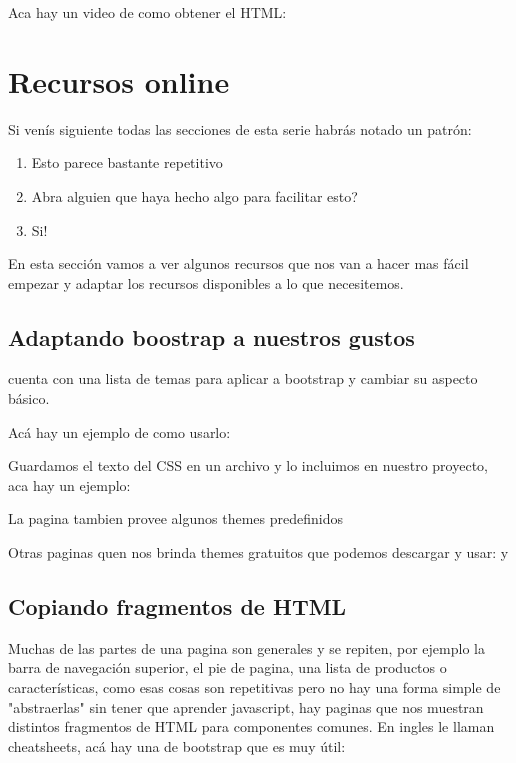 \documentclass[letterpaper,10pt,spanish]{sphinxmanual}
\begin{document}
Aca hay un video de como obtener el HTML:




\chapter{Recursos online}
\label{\detokenize{recursos-online::doc}}\label{\detokenize{recursos-online:recursos-online}}
Si venís siguiente todas las secciones de esta serie habrás notado un patrón:
\begin{enumerate}
\item {} 
Esto parece bastante repetitivo

\item {} 
Abra alguien que haya hecho algo para facilitar esto?

\item {} 
Si!

\end{enumerate}

En esta sección vamos a ver algunos recursos que nos van a hacer mas
fácil empezar y adaptar los recursos disponibles a lo que necesitemos.


\section{Adaptando boostrap a nuestros gustos}
\label{\detokenize{recursos-online:adaptando-boostrap-a-nuestros-gustos}}
 cuenta con una lista de temas
para aplicar a bootstrap y cambiar su aspecto básico.

Acá hay un ejemplo de como usarlo:



Guardamos el texto del CSS en un archivo y lo incluimos en nuestro proyecto, aca hay un ejemplo: 

La pagina tambien provee algunos themes predefinidos 

Otras paginas quen nos brinda themes gratuitos que podemos descargar y
usar:  y 


\section{Copiando fragmentos de HTML}
\label{\detokenize{recursos-online:copiando-fragmentos-de-html}}
Muchas de las partes de una pagina son generales y se repiten, por ejemplo
la barra de navegación superior, el pie de pagina, una lista de productos o
características, como esas cosas son repetitivas pero no hay una forma simple
de "abstraerlas" sin tener que aprender javascript, hay paginas que nos muestran
distintos fragmentos de HTML para componentes comunes. En ingles le llaman
cheatsheets, acá hay una de bootstrap que es muy útil: 
\end{document}
